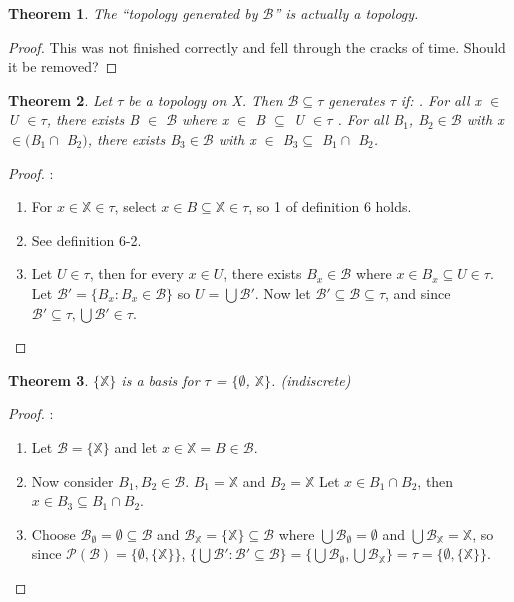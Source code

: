 \documentclass{amsart}
\theoremstyle{plain}
\newtheorem{theorem}{Theorem}
\theoremstyle{definition}
\theoremstyle{remark}
\begin{document}
	\begin{theorem}
		The ``topology generated by \(\mathcal{B}\)'' is actually a topology.
	\end{theorem}
	\begin{proof} 
	This was not finished correctly and fell through the cracks of time. Should it be removed?
	\end{proof}

	\begin{theorem}
	Let $\tau$ be a topology on X. Then $\mathcal{B} \subseteq \tau$ generates $\tau$ if:
	. For all x $\in$ U $\in \tau$, there exists B $\in$ $\mathcal{B}$ where x $\in$ B $\subseteq$ U $\in \tau$
	. For all B$_1$, B$_2 \in \mathcal{B}$ with x $\in ($B$_1 \cap$ B$_2)$, there exists B$_3 \in \mathcal{B}$ with x $\in$ B$_3 \subseteq$ B$_1 \cap$ B$_2$.
\end{theorem}
\begin{proof}:\newline
	\begin{enumerate}
		\item For $x \in \mathbb{X} \in \tau$, select $x \in B \subseteq \mathbb{X} \in \tau$, so 1 of definition 6 holds.
		\item See definition 6-2.
		\item Let $U \in \tau$, then for every $x \in U$, there exists $B_x \in \mathcal{B}$ where $x \in B_x \subseteq U \in \tau$. Let $\mathcal{B'} = \lbrace B_x : B_x \in \mathcal{B} \rbrace$ so $U = \bigcup \mathcal{B'}$. Now let $\mathcal{B'} \subseteq \mathcal{B} \subseteq \tau$, and since $\mathcal{B'} \subseteq \tau, \bigcup \mathcal{B'} \in \tau$.
		\end{enumerate}
\end{proof}

	\begin{theorem}
	$\lbrace\mathbb{X}\rbrace$ is a basis for $\tau$ = $\lbrace\emptyset$, $\mathbb{X}\rbrace$. (indiscrete)
	\end{theorem}
	\begin{proof}:\newline
	\begin{enumerate}
		\item Let $\mathcal{B} = \lbrace\mathbb{X}\rbrace$ and let $x \in \mathbb{X} = B \in \mathcal{B}$.
		\item Now consider $B_1, B_2 \in \mathcal{B}$. $B_1 = \mathbb{X}$ and $B_2 = \mathbb{X}$ Let $x \in B_1 \cap B_2$, then $x \in B_3 \subseteq B_1 \cap B_2$.
		\item Choose $\mathcal{B}_\emptyset = \emptyset \subseteq \mathcal{B}$ and $\mathcal{B}_\mathbb{X} = \lbrace \mathbb{X} \rbrace \subseteq \mathcal{B}$ where $\bigcup \mathcal{B}_\emptyset = \emptyset$ and $\bigcup \mathcal{B}_\mathbb{X} = \mathbb{X}$, so since $\mathcal{P}(\mathcal{B}) = \lbrace \emptyset, \lbrace \mathbb{X} \rbrace \rbrace$, $\lbrace \bigcup \mathcal{B'} : \mathcal{B'} \subseteq \mathcal{B} \rbrace = \lbrace \bigcup \mathcal{B}_\emptyset, \bigcup \mathcal{B}_\mathbb{X} \rbrace = \tau = \lbrace \emptyset, \lbrace \mathbb{X} \rbrace \rbrace$.
	\end{enumerate}
	\end{proof}
\end{document}
